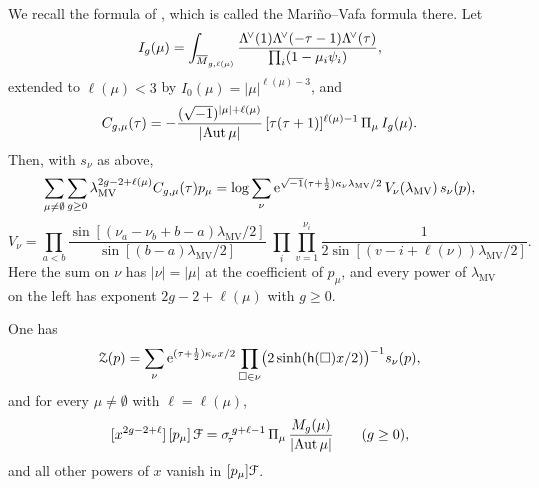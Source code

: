 We recall the formula of \cite[Introduction, eq.~(1)--(3)]{LLZ03}, which is called the Mari\~no--Vafa formula there. Let
\[
I_g(\mu)=\int_{\overline{M}_{g,\ell(\mu)}}\frac{\Lambda^{\!\vee}(1)\Lambda^{\!\vee}(-\tau-1)\Lambda^{\!\vee}(\tau)}{\prod_i(1-\mu_i\psi_i)},
\]
extended to $\ell(\mu)<3$ by $I_0(\mu)=\lvert\mu\rvert^{\ell(\mu)-3}$, and
\begin{equation}\label{eq:van-LLZdef}
C_{g,\mu}(\tau)=-\frac{(\sqrt{-1})^{\lvert\mu\rvert+\ell(\mu)}}{\lvert\operatorname{Aut}\mu\rvert}\,[\tau(\tau+1)]^{\ell(\mu)-1}\,\Pi_\mu\,I_g(\mu).
\end{equation}
Then, with $s_\nu$ as above,
\begin{equation}\label{eq:van-LLZ}
\sum_{\mu\neq\emptyset}\sum_{g\geq 0}\lambda_{\mathrm{MV}}^{2g-2+\ell(\mu)}C_{g,\mu}(\tau)p_\mu
=\log\sum_\nu\mathrm{e}^{\sqrt{-1}(\tau+\frac12)\kappa_\nu\lambda_{\mathrm{MV}}/2}\,V_\nu(\lambda_{\mathrm{MV}})\,s_\nu(p),
\end{equation}
\begin{equation}\label{eq:van-LLZV}
V_\nu=\prod_{a<b}\frac{\sin[(\nu_a-\nu_b+b-a)\lambda_{\mathrm{MV}}/2]}{\sin[(b-a)\lambda_{\mathrm{MV}}/2]}\;\prod_i\prod_{v=1}^{\nu_i}\frac{1}{2\sin[(v-i+\ell(\nu))\lambda_{\mathrm{MV}}/2]}.
\end{equation}
Here the sum on $\nu$ has $\lvert\nu\rvert=\lvert\mu\rvert$ at the coefficient of $p_\mu$, and every power of $\lambda_{\mathrm{MV}}$ on the left has exponent $2g-2+\ell(\mu)$ with $g\geq 0$.

\begin{prop}\label{prop:van-real}
One has
\[
\mathcal{Z}(p)=\sum_\nu\mathrm{e}^{(\tau+\frac12)\kappa_\nu x/2}\prod_{\square\in\nu}\bigl(2\sinh(\mathsf{h}(\square)x/2)\bigr)^{-1}s_\nu(p),
\]
and for every $\mu\neq\emptyset$ with $\ell=\ell(\mu)$,
\begin{equation}\label{eq:van-real}
[x^{2g-2+\ell}]\,[p_\mu]\,\mathcal{F}=\sigma_{\!\tau}^{\,g+\ell-1}\,\Pi_\mu\,\frac{M_g(\mu)}{\lvert\operatorname{Aut}\mu\rvert}\qquad(g\geq 0),
\end{equation}
and all other powers of $x$ vanish in $[p_\mu]\mathcal{F}$.
\end{prop}

